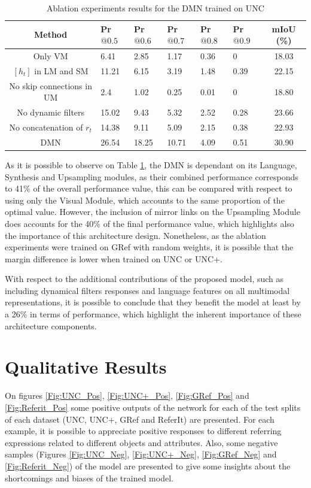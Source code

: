 \begin{table}[!htbp]
    \centering
    \begin{tabular}{ c | p{1.2cm} p{1.2cm} p{1.2cm} p{1.2cm} p{1.2cm} | c }
\hline
Method 								& Pr$@0.5$		& Pr$@0.6$		& Pr$@0.7$		& Pr$@0.8$		& Pr$@0.9$		& mIoU (\%)			\\
\hline
Only VM 							& 6.41 			& 2.85 			& 1.17 			& 0.36 			& 0 			& 18.03 		\\
$[h_{t}]$ in LM and SM	& 11.21 		& 6.15 			& 3.19			& 1.48 			& 0.39			& 22.15 		\\
No skip connections in UM 			& 2.4 			& 1.02 			& 0.25 			& 0.01 			& 0 			& 18.80 		\\
No dynamic filters					& 15.02 		& 9.43 			& 5.32 			& 2.52 			& 0.28 			& 23.66 		\\
No concatenation of $r_{t}$			& 14.38 		& 9.11 			& 5.09			& 2.15 			& 0.38			& 22.93 		\\
\hline
DMN							& 26.54 		& 18.25 		& 10.71 		& 4.09 			& 0.51 			& 30.90	 		\\
\hline
\end{tabular}
    \caption{Ablation experiments results for the DMN trained on UNC}
    \label{Tab:Ablation}
\end{table}

As it is possible to observe on Table \ref{Tab:Ablation}, the DMN is dependant on its Language, Synthesis and Upsampling modules, as their combined performance corresponds to 41\% of the overall performance value, this can be compared with respect to using only the Visual Module, which accounts to the same proportion of the optimal value. However, the inclusion of mirror links on the Upsampling Module does accounts for the 40\% of the final performance value, which highlights also the importance of this architecture design. Nonetheless, as the ablation experiments were trained on GRef with random weights, it is possible that the margin difference is lower when trained on UNC or UNC+.

With respect to the additional contributions of the proposed model, such as including dynamical filters responses and language features on all multimodal representations, it is possible to conclude that they benefit the model at least by a 26\% in terms of performance, which highlight the inherent importance of these architecture components. 

\section{Qualitative Results}
\label{section:db_examples}
On figures \ref{Fig:UNC_Pos}, \ref{Fig:UNC+_Pos}, \ref{Fig:GRef_Pos} and \ref{Fig:Referit_Pos} some positive outputs of the network for each of the test splits of each dataset (UNC, UNC+, GRef and ReferIt) are presented. For each example, it is possible to appreciate positive responses to different referring expressions related to different objects and attributes. Also, some negative samples (Figures \ref{Fig:UNC_Neg}, \ref{Fig:UNC+_Neg}, \ref{Fig:GRef_Neg} and \ref{Fig:Referit_Neg}) of the model are presented to give some insights about the shortcomings and biases of the trained model.

